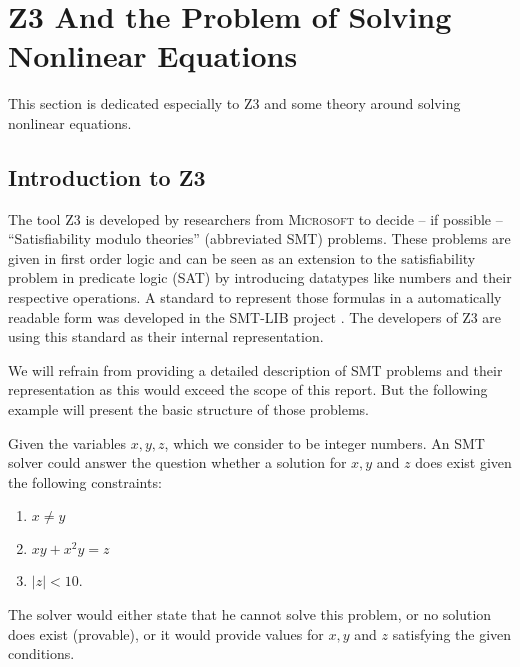 \documentclass[oribibl]{llncs}
\begin{document}




\section{\textsc{Z3} And the Problem of Solving Nonlinear Equations}
\label{sctn:Z3}

This section is dedicated especially to \textsc{Z3} and some theory
around solving nonlinear equations.

\subsection{Introduction to Z3}
The tool \textsc{Z3} \cite{de2008z3}  is developed by researchers from \textsc{Microsoft} to decide -- if
possible -- ``Satisfiability modulo theories'' (abbreviated SMT)
problems. These problems are given in first order logic and can be
seen as an extension to the satisfiability problem in predicate logic
(SAT) by introducing datatypes like numbers and their respective
operations. A standard to represent those formulas in a automatically
readable form was developed in the \textsc{SMT-LIB} project  \cite{barrett2010smt}.
The developers of \textsc{Z3} are using this standard as their
internal representation.

We will refrain from providing a detailed description of SMT problems
and their representation as this would exceed the scope of this
report. But the following example will present the basic structure of
those problems.

\begin{example}
  Given the variables $x,y,z$, which we consider to
  be integer numbers. An SMT solver could answer the question whether
  a solution for $x,y$ and $z$ does exist given the following
  constraints:
  \begin{enumerate}
    \item $x \neq y$
    \item $xy+x^2y=z$
    \item $|z|<10$.
  \end{enumerate}
  The solver would either state that he cannot solve this problem, or
  no solution does exist (provable), or it would provide values for
  $x,y$ and $z$ satisfying the given conditions.
\end{example}
\end{document}
